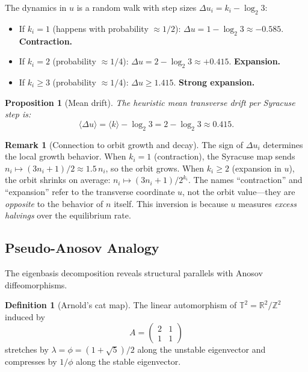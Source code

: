 \documentclass[11pt,a4paper]{article}
\newcommand{\Z}{\mathbb{Z}}
\newcommand{\R}{\mathbb{R}}
\newcommand{\T}{\mathbb{T}}
\theoremstyle{plain}
\newtheorem{proposition}[theorem]{Proposition}
\theoremstyle{definition}
\newtheorem{definition}[theorem]{Definition}
\newtheorem{remark}[theorem]{Remark}
\begin{document}
The dynamics in $u$ is a random walk with step sizes $\Delta u_i = k_i - \log_2 3$:
\begin{itemize}
    \item If $k_i = 1$ (happens with probability $\approx 1/2$): $\Delta u = 1 - \log_2 3 \approx -0.585$. \textbf{Contraction.}
    \item If $k_i = 2$ (probability $\approx 1/4$): $\Delta u = 2 - \log_2 3 \approx +0.415$. \textbf{Expansion.}
    \item If $k_i \geq 3$ (probability $\approx 1/4$): $\Delta u \geq 1.415$. \textbf{Strong expansion.}
\end{itemize}

\begin{proposition}[Mean drift]\label{prop:drift}
    The heuristic mean transverse drift per Syracuse step is:
    \begin{equation}\label{eq:mean-drift}
        \langle \Delta u \rangle = \langle k \rangle - \log_2 3 = 2 - \log_2 3 \approx 0.415.
    \end{equation}
\end{proposition}

\begin{remark}[Connection to orbit growth and decay]
    The sign of $\Delta u_i$ determines the local growth behavior. When $k_i = 1$ (contraction), the Syracuse map sends $n_i \mapsto (3n_i+1)/2 \approx 1.5\, n_i$, so the orbit grows. When $k_i \geq 2$ (expansion in $u$), the orbit shrinks on average: $n_i \mapsto (3n_i+1)/2^{k_i}$. The names ``contraction'' and ``expansion'' refer to the transverse coordinate $u$, not the orbit value---they are \emph{opposite} to the behavior of $n$ itself. This inversion is because $u$ measures \emph{excess halvings} over the equilibrium rate.
\end{remark}


\subsection{Pseudo-Anosov Analogy}

The eigenbasis decomposition reveals structural parallels with Anosov diffeomorphisms.

\begin{definition}[Arnold's cat map]
    The linear automorphism of $\T^2 = \R^2/\Z^2$ induced by
    \begin{equation}
        A = \begin{pmatrix} 2 & 1 \\ 1 & 1 \end{pmatrix}
    \end{equation}
    stretches by $\lambda = \phi = (1+\sqrt{5})/2$ along the unstable eigenvector and compresses by $1/\phi$ along the stable eigenvector.
\end{definition}
\end{document}
